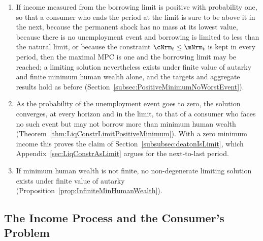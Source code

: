 \documentclass[\econtexRoot/BufferStockTheory]{subfiles}
\begin{document}
\begin{enumerate}
His general theorem for increasing Markov processes does, and delivers the same conclusions under the same conditions (Proposition~\ref{prop:invariantPositiveMinimum}).
\item If income measured from the borrowing limit is positive with probability one, so that a consumer who ends the period at the limit is sure to be above it in the next, because the permanent shock has no mass at its lowest value, because there is no unemployment event and borrowing is limited to less than the natural limit, or because the constraint $\cNrm_{t}\leq\mNrm_{t}$ is kept in every period, then the maximal MPC is one and the borrowing limit may be reached; a limiting solution nevertheless exists under finite value of autarky and finite minimum human wealth alone, and the targets and aggregate results hold as before (Section~\ref{subsec:PositiveMinimumNoWorstEvent}).
\item As the probability of the unemployment event goes to zero, the solution converges, at every horizon and in the limit, to that of a consumer who faces no such event but may not borrow more than minimum human wealth (Theorem~\ref{thm:LiqConstrLimitPositiveMinimum}). With a zero minimum income this proves the claim of Section~\ref{subsubsec:deatonIsLimit}, which Appendix~\ref{sec:LiqConstrAsLimit} argues for the next-to-last period.
\item If minimum human wealth is not finite, no non-degenerate limiting solution exists under finite value of autarky (Proposition~\ref{prop:InfiniteMinHumanWealth}).
\end{enumerate}

\subsection{The Income Process and the Consumer's Problem}\label{subsec:PositiveMinimumSetup}
\end{document}
